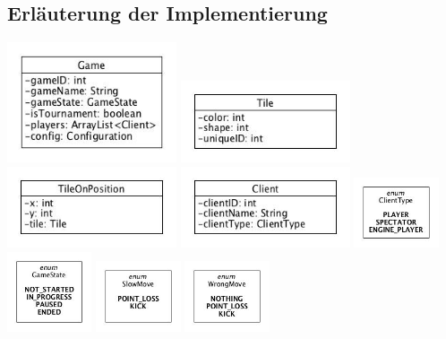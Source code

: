 \documentclass[a4paper, 10pt]{article}
\begin{document}
\subsection{Erläuterung der Implementierung}
\label{sec:implementierung}
\includegraphics[width=5cm]{media/ClassGame}
\includegraphics[width=5cm]{media/ClassTile}
\includegraphics[width=5cm]{media/ClassTileOnPosition}
\includegraphics[width=5cm]{media/ClassClient}
\includegraphics[width=2.5cm]{media/EnumClientType}
\includegraphics[width=2.5cm]{media/EnumGameState}
\includegraphics[width=2.5cm]{media/EnumSlowMove}
\includegraphics[width=2.5cm]{media/EnumWrongMove}\par
\end{document}
